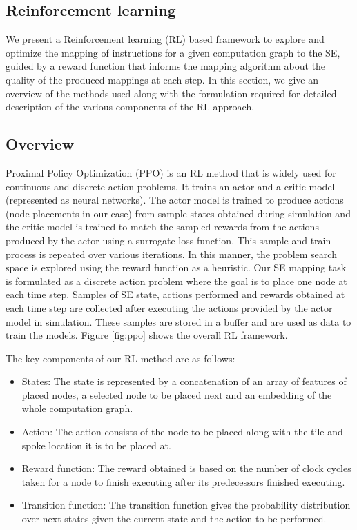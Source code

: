 \subsection{Reinforcement learning}

We present a Reinforcement learning (RL) based framework to explore and optimize the mapping of instructions for a given computation graph to the SE, guided by a reward function that informs the mapping algorithm about the quality of the produced mappings at each step. In this section, we give an overview of the methods used along with the formulation required for detailed description of the various components of the RL approach.

\subsection{Overview}
Proximal Policy Optimization (PPO) \cite{schulman2017proximal} is an RL method that is  widely used for continuous and discrete action problems. 
It trains an actor and a critic model (represented as neural networks).
The actor model is trained to produce actions (node placements in our case) from sample states obtained during simulation and the critic model is trained to match the sampled rewards from the actions produced by the actor using a surrogate loss function. 
This sample and train process is repeated over various iterations. 
In this manner, the problem search space is explored using the reward function as a heuristic.
Our SE mapping task is formulated as a discrete action problem where the goal is to place one node at each time step. 
Samples of SE state, actions performed and rewards obtained at each time step are collected after executing the actions provided by the actor model in simulation. 
These samples are stored in a buffer and are used as data to train the models.
Figure \ref{fig:ppo} shows the overall RL framework. 

The key components of our RL method are as follows:
\begin{itemize}
  \item States: The state is represented by a concatenation of an array of features of placed nodes, a selected node to be placed next and an embedding of the whole computation graph. 
  \item Action: The action consists of the node to be placed along with the tile and spoke location it is to be placed at.
  \item Reward function: The reward obtained is based on the number of clock cycles taken for a node to finish executing after its predecessors finished executing.
  \item Transition function: The transition function gives the probability distribution over next states given the current state and the action to be performed.
\end{itemize}

